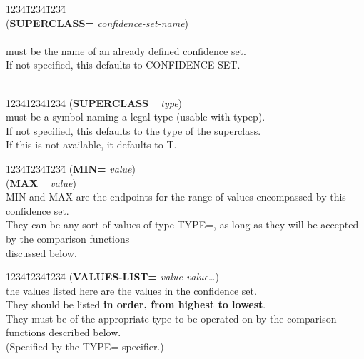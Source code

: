\begin{tabbing}
1234\=1234\=1234\= \kill
\\
({\bf SUPERCLASS=} {\it confidence-set-name}) \\
\\
 must be the name of an already defined confidence set.\\
\>\> If not specified, this defaults to CONFIDENCE-SET. \\
\\
\end{tabbing}

\begin{tabbing}
1234\=1234\=1234\= \kill
({\bf SUPERCLASS=} {\it type}) \\
 must be a symbol naming a legal type (usable with typep).\\
\>\>If not specified, this defaults to the type of the superclass.\\
\>\>If this is not available, it defaults to T. \\
\end{tabbing}


\begin{tabbing}
1234\=1234\=1234\= \kill
({\bf MIN=} {\it value}) \\
({\bf MAX=} {\it value}) \\
\>MIN and MAX are the endpoints for the range of values encompassed by this confidence set.\\
\>\>\> They can be any sort of values of type TYPE=, as long as they will be accepted by the comparison functions \\
\>\>\>discussed below. \\
\end{tabbing}


\begin{tabbing}
1234\=1234\=1234\= \kill
({\bf VALUES-LIST=} {\it value value\/}\ldots) \\
\>the values listed here are the values in the confidence set. \\
\>\>They should be listed {\bf in order, from highest to lowest}. \\
\>\>They must be of the appropriate type to be operated on by the
comparison functions described below. \\
\>\>\>(Specified by the TYPE= specifier.)\\
\\
\end{tabbing}

